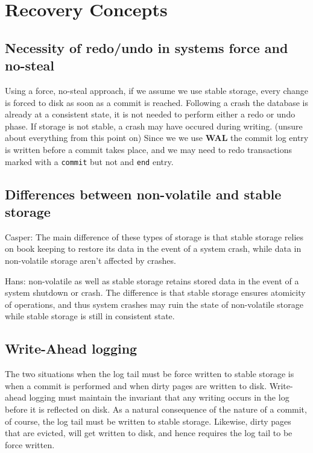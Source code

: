 
\section{Recovery Concepts}

\subsection{Necessity of redo/undo in systems force and no-steal}
Using a force, no-steal approach, if we assume we use stable storage,
every change is forced to disk as soon as a commit is reached. Following a
crash the database is already at a consistent state, it is not needed to
perform either a redo or undo phase. If storage is not stable, a crash may
have occured during writing. (unsure about everything from this point on)
Since we we use {\bf WAL} the commit log entry is written before a commit
takes place, and we may need to redo transactions marked with a {\tt commit} but not
and {\tt end} entry.

\subsection{Differences between non-volatile and stable storage}
Casper:
The main difference of these types of storage is that stable storage relies on
book keeping to restore its data in the event of a system crash, while data in
non-volatile storage aren't affected by crashes.

Hans:
non-volatile as well as stable storage retains stored data in the event of a
system shutdown or crash. The difference is that stable storage ensures
atomicity of operations, and thus system crashes may ruin the state of
non-volatile storage while stable storage is still in consistent state.

\subsection{Write-Ahead logging}

The two situations when the log tail must be force written to stable storage
is when a commit is performed and when dirty pages are written to disk.
Write-ahead logging must maintain the invariant that any writing occurs in the
log before it is reflected on disk. As a natural consequence of the nature of
a commit, of course, the log tail must be written to stable storage. Likewise,
dirty pages that are evicted, will get written to disk, and hence requires the
log tail to be force written.

